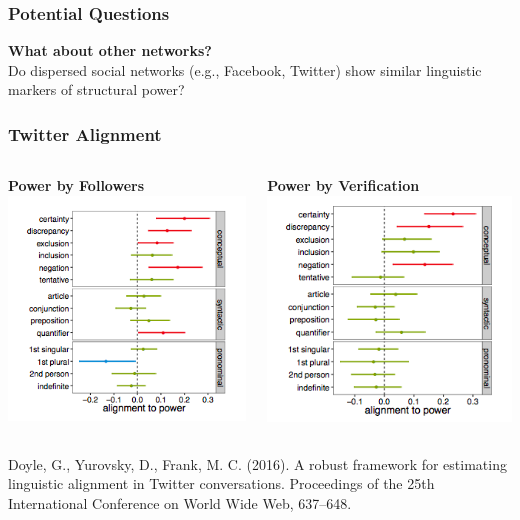 \documentclass{beamer}
\begin{document}
\begin{frame}
\frametitle{Potential Questions}
\textbf{What about other networks?}\\
Do dispersed social networks (e.g., Facebook, Twitter) show similar linguistic markers of structural power?
\end{frame}
\begin{frame}
\frametitle{Twitter Alignment}
\begin{columns}[c]
\textbf{Power by Followers}
\includegraphics[width=0.8\linewidth]{twitterfollower.png}

\textbf{Power by Verification}
\includegraphics[width=0.8\linewidth]{twitterverified.png}

\end{columns}
\vspace{12mm}
\footnotesize{Doyle, G., Yurovsky, D., Frank, M. C. (2016). A robust framework for estimating linguistic alignment in Twitter conversations. Proceedings of the 25th International Conference on World Wide Web, 637–648.} 
\end{frame}
\end{document}
